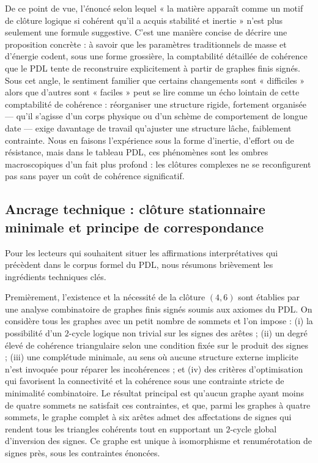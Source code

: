 \documentclass[11pt,a4paper]{article}
\theoremstyle{definition}
\begin{document}
De ce point de vue, l’énoncé selon lequel « la matière apparaît comme un motif de clôture logique si cohérent qu’il a acquis stabilité et inertie » n’est plus seulement une formule suggestive.\cite{Laubscher_Existence_PulsatingClosure_2026} C’est une manière concise de décrire une proposition concrète : à savoir que les paramètres traditionnels de masse et d’énergie codent, sous une forme grossière, la comptabilité détaillée de cohérence que le PDL tente de reconstruire explicitement à partir de graphes finis signés. Sous cet angle, le sentiment familier que certains changements sont « difficiles » alors que d’autres sont « faciles » peut se lire comme un écho lointain de cette comptabilité de cohérence : réorganiser une structure rigide, fortement organisée — qu’il s’agisse d’un corps physique ou d’un schème de comportement de longue date — exige davantage de travail qu’ajuster une structure lâche, faiblement contrainte. Nous en faisons l’expérience sous la forme d’inertie, d’effort ou de résistance, mais dans le tableau PDL, ces phénomènes sont les ombres macroscopiques d’un fait plus profond : les clôtures complexes ne se reconfigurent pas sans payer un coût de cohérence significatif.

\subsection{Ancrage technique : clôture stationnaire minimale et principe de correspondance}

Pour les lecteurs qui souhaitent situer les affirmations interprétatives qui précèdent dans le corpus formel du PDL, nous résumons brièvement les ingrédients techniques clés.\cite{Laubscher_IntroPDL_2024,Laubscher_EmergencePhysicalReality_2024,Laubscher_MinimalClosures_46_2024,Laubscher_PDL_Position_2024}

Premièrement, l’existence et la nécessité de la clôture \((4,6)\) sont établies par une analyse combinatoire de graphes finis signés soumis aux axiomes du PDL. On considère tous les graphes avec un petit nombre de sommets et l’on impose : (i) la possibilité d’un \(2\)-cycle logique non trivial sur les signes des arêtes ; (ii) un degré élevé de cohérence triangulaire selon une condition fixée sur le produit des signes ; (iii) une complétude minimale, au sens où aucune structure externe implicite n’est invoquée pour réparer les incohérences ; et (iv) des critères d’optimisation qui favorisent la connectivité et la cohérence sous une contrainte stricte de minimalité combinatoire.\cite{Laubscher_MinimalClosures_46_2024} Le résultat principal est qu’aucun graphe ayant moins de quatre sommets ne satisfait ces contraintes, et que, parmi les graphes à quatre sommets, le graphe complet à six arêtes admet des affectations de signes qui rendent tous les triangles cohérents tout en supportant un \(2\)-cycle global d’inversion des signes. Ce graphe est unique à isomorphisme et renumérotation de signes près, sous les contraintes énoncées.\cite{Laubscher_MinimalClosures_46_2024}
\end{document}

